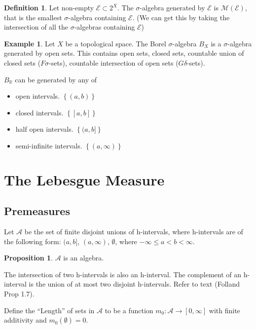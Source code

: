 \documentclass[11pt]{article}
\theoremstyle{definition}
\newtheorem{defn}{Definition}[section]
\newtheorem{example}{Example}[section]
\newtheorem{prop}{Proposition}[section]
\newcommand{\set}[1]{\left\{ #1 \right\}}
\newcommand{\RR}{\mathbb{R}}
\newcommand{\m}[1]{\mathcal{#1}}
\begin{document}
\begin{defn}
    Let non-empty $\m{E}\subset 2^X$. The $\sigma$-algebra generated by $\m{E}$
    is $\m{M}(\m{E})$, that is the smallest $\sigma$-algebra containing $\m{E}$.
    (We can get this by taking the intersection of all the $\sigma$-algebras
    containing $\m{E}$)
\end{defn}

\begin{example}
    Let $X$ be a topological space. The Borel $\sigma$-algebra $B_X$ is a
    $\sigma$-algebra generated by open sets. This contains open sets, closed
    sets, countable union of closed sets ($F\sigma$-sets), countable
    intersection of open sets ($G\delta$-sets).

    $B_\RR$ can be generated by any of
    \begin{itemize}
        \item open intervals. $\set{(a,b)}$
        \item closed intervals. $\set{[a,b]}$
        \item half open intervals. $\set{(a,b]}$
        \item semi-infinite intervals. $\set{(a,\infty)}$
    \end{itemize}
\end{example}


\section{The Lebesgue Measure}

\subsection{Premeasures}
Let $\m{A}$ be the set of finite disjoint unions of h-intervals, where
h-intervals are of the following form: $(a,b]$, $(a,\infty)$, $\emptyset$, where
$-\infty\le a<b<\infty$. 

\begin{prop}
    $\m{A}$ is an algebra.
\end{prop}
\proof
The intersection of two h-intervals is also an h-interval. The complement of an
h-interval is the union of at most two disjoint h-intervals. Refer to text
(Folland Prop 1.7).
\qedhere

Define the ``Length'' of sets in $\m{A}$ to be a function
$m_0:\m{A}\to[0,\infty]$ with finite additivity and $m_0(\emptyset)=0$.
\end{document}
